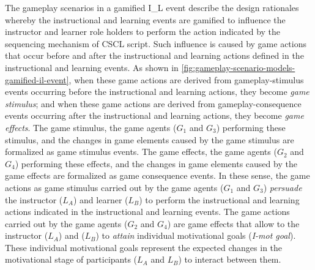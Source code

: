 The gameplay scenarios in a gamified I\_L event describe the design rationales whereby the instructional and learning events are gamified to influence the instructor and learner role holders to perform the action indicated by the sequencing mechanism of CSCL script. Such influence is caused by game actions that occur before and after the instructional and learning actions defined in the instructional and learning events. As shown in \autoref{fig:gameplay-scenario-models-gamified-il-event}, when these game actions are derived from gameplay-stimulus events occurring before the instructional and learning actions, they become \emph{game stimulus}; and when these game actions are derived from gameplay-consequence events occurring after the instructional and learning actions, they become \emph{game effects}. The game stimulus, the game agents ($G_{1}$ and $G_{3}$) performing these stimulus, and the changes in game elements caused by the game stimulus are formalized as game stimulus events. The game effects, the game agents ($G_{2}$ and $G_{4}$) performing these effects, and the changes in game elements caused by the game effects are formalized as game consequence events. In these sense, the game actions as game stimulus carried out by the game agents ($G_{1}$ and $G_{3}$) \emph{persuade} the instructor ($L_{A}$) and learner ($L_{B}$) to perform the instructional and learning actions indicated in the instructional and learning events. The game actions carried out by the game agents ($G_{2}$ and $G_{4}$) are game effects that allow to the instructor ($L_{A}$) and ($L_{B}$) to \emph{attain} individual motivational goals (\emph{I-mot goal}). These individual motivational goals represent the expected changes in the motivational stage of participants ($L_{A}$ and $L_{B}$) to interact between them.

